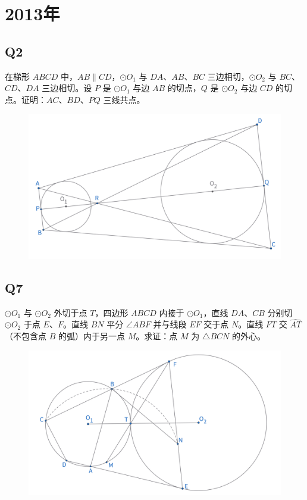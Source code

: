 \documentclass{article}
\begin{document}
\newpage 
\section{2013年}
\subsection{Q2}
在梯形 $ABCD$ 中，$AB \parallel CD$，$\odot O_1$ 与 $DA$、$AB$、$BC$ 三边相切，$\odot O_2$ 与 $BC$、$CD$、$DA$ 三边相切。设 $P$ 是 $\odot O_1$ 与边 $AB$ 的切点，$Q$ 是 $\odot O_2$ 与边 $CD$ 的切点。证明：$AC$、$BD$、$PQ$ 三线共点。
\begin{figure}[htbp]
    \centering
    \includegraphics[width=0.7\linewidth]{figures/女子赛13年Q2.png}
\end{figure}


\subsection{Q7}
$\odot O_1$ 与 $\odot O_2$ 外切于点 $T$，四边形 $ABCD$ 内接于 $\odot O_1$，直线 $DA$、$CB$ 分别切 $\odot O_2$ 于点 $E$、$F$。直线 $BN$ 平分 $\angle ABF$ 并与线段 $EF$ 交于点 $N$。直线 $FT$ 交 $\widehat{AT}$（不包含点 $B$ 的弧）内于另一点 $M$。求证：点 $M$ 为 $\triangle BCN$ 的外心。
\begin{figure}[htbp]
    \centering
    \includegraphics[width=0.7\linewidth]{figures/女子赛13年Q7.png}
\end{figure}
\end{document}
